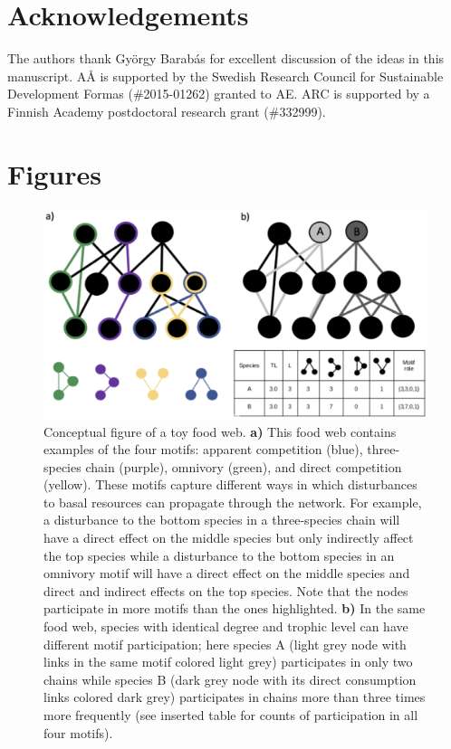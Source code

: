 \documentclass[12pt]{article}
\begin{document}
\begin{spacing}{2.0}
\section*{Acknowledgements}

    The authors thank Gy\"{o}rgy Barab\'{a}s for excellent discussion of the ideas in this manuscript. A{\AA} is supported by the Swedish Research Council for Sustainable Development Formas (\#2015-01262) granted to AE. ARC is supported by a Finnish Academy postdoctoral research grant (\#332999).

\clearpage    

\section*{Figures}
    
        \begin{figure}[hb!]
        \centering
        \includegraphics[width=1.0\textwidth]{figures/concept_fig_ver2_edit.eps}
        \caption{Conceptual figure of a toy food web. \textbf{a)} This food web contains examples of the four motifs: apparent competition (blue), three-species chain (purple), omnivory (green), and direct competition (yellow). These motifs capture different ways in which disturbances to basal resources can propagate through the network. For example, a disturbance to the bottom species in a three-species chain will have a direct effect on the middle species but only indirectly affect the top species while a disturbance to the bottom species in an omnivory motif will have a direct effect on the middle species and direct and indirect effects on the top species. 
        Note that the nodes participate in more motifs than the ones highlighted. \textbf{b)} In the same food web, species with identical degree and trophic level can have different motif participation; here species A (light grey node with links in the same motif colored light grey) participates in only two chains while species B (dark grey node with its direct consumption links colored dark grey) participates in chains more than three times more frequently (see inserted table for counts of participation in all four motifs). 
}
\end{figure}
\end{spacing}
\end{document}
